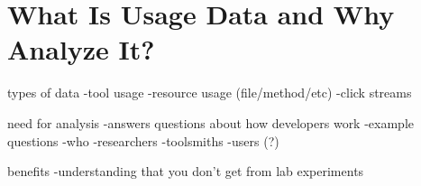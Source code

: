 \section{What Is Usage Data and Why Analyze It?}

types of data
	-tool usage
	-resource usage (file/method/etc)
	-click streams

need for analysis
	-answers questions about how developers work
	-example questions
	-who
		-researchers
		-toolsmiths
		-users (?)

benefits
	-understanding that you don't get from lab experiments